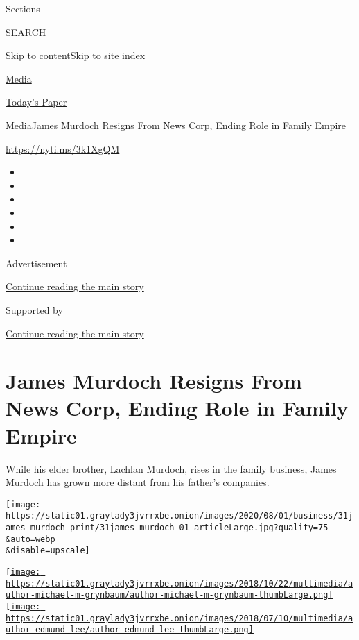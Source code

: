 Sections

SEARCH

\protect\hyperlink{site-content}{Skip to
content}\protect\hyperlink{site-index}{Skip to site index}

\href{https://www.nytimes3xbfgragh.onion/section/business/media}{Media}

\href{https://myaccount.nytimes3xbfgragh.onion/auth/login?response_type=cookie\&client_id=vi}{}

\href{https://www.nytimes3xbfgragh.onion/section/todayspaper}{Today's
Paper}

\href{/section/business/media}{Media}\textbar{}James Murdoch Resigns
From News Corp, Ending Role in Family Empire

\href{https://nyti.ms/3k1XgQM}{https://nyti.ms/3k1XgQM}

\begin{itemize}
\item
\item
\item
\item
\item
\item
\end{itemize}

Advertisement

\protect\hyperlink{after-top}{Continue reading the main story}

Supported by

\protect\hyperlink{after-sponsor}{Continue reading the main story}

\hypertarget{james-murdoch-resigns-from-news-corp-ending-role-in-family-empire}{%
\section{James Murdoch Resigns From News Corp, Ending Role in Family
Empire}\label{james-murdoch-resigns-from-news-corp-ending-role-in-family-empire}}

While his elder brother, Lachlan Murdoch, rises in the family business,
James Murdoch has grown more distant from his father's companies.

\texttt{[image: https://static01.graylady3jvrrxbe.onion/images/2020/08/01/business/31james-murdoch-print/31james-murdoch-01-articleLarge.jpg?quality=75\\\&auto=webp\\\&disable=upscale]}

\href{https://www.nytimes3xbfgragh.onion/by/michael-m-grynbaum}{\texttt{[image: https://static01.graylady3jvrrxbe.onion/images/2018/10/22/multimedia/author-michael-m-grynbaum/author-michael-m-grynbaum-thumbLarge.png]}}\href{https://www.nytimes3xbfgragh.onion/by/edmund-lee}{\texttt{[image: https://static01.graylady3jvrrxbe.onion/images/2018/07/10/multimedia/author-edmund-lee/author-edmund-lee-thumbLarge.png]}}

